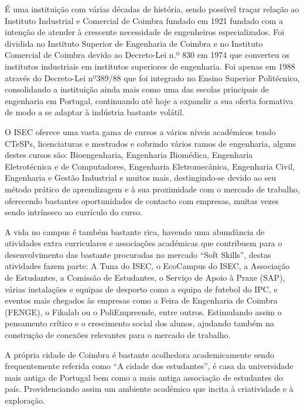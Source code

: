         É uma instituição com várias décadas de história, sendo possível traçar relação ao Instituto Industrial e Comercial de Coimbra fundado em 1921\cite{iscac} fundado com a intenção de atender à crescente necessidade de engenheiros especializados. Foi dividida no Instituto Superior de Engenharia de Coimbra e no Instituto Comercial de Coimbra devido ao Decreto-Lei n.º 830\cite{iscac} em 1974 que converteu os institutos industriais em institutos superiores de engenharia. Foi apenas em 1988\cite{wiki-isec} através do Decreto-Lei nº389/88\cite{decreto389/88} que foi integrado no Ensino Superior Politécnico, consolidando a instituição ainda mais como uma das escolas principais de engenharia em Portugal, continuando até hoje a expandir a sua oferta formativa de modo a se adaptar à indústria bastante volátil.
    
        O ISEC oferece uma vasta gama de cursos a vários níveis académicos tendo CTeSPs, licenciaturas e mestrados e cobrindo vários ramos de engenharia, alguns destes cursos são: Bioengenharia, Engenharia Biomédica, Engenharia Eletrotécnica e de Computadores, Engenharia Eletromecânica, Engenharia Civil, Engenharia e Gestão Industrial e muitos mais, destingindo-se devido ao seu método prático de aprendizagem e à sua proximidade com o mercado de trabalho, oferecendo bastantes oportunidades de contacto com empresas, muitas vezes sendo intrínseco ao currículo do curso.
    
        A vida no campus é também bastante rica, havendo uma abundância de atividades extra curriculares e associações académicas que contribuem para o desenvolvimento das bastante procuradas no mercado ``Soft Skills'', destas atividades fazem parte: A Tuna do ISEC, o EcoCampus do ISEC, a Associação de Estudantes, a Comissão de Estudantes, o Serviço de Apoio à Praxe (SAP), várias instalações e equipas de desporto como a equipa de futebol do IPC, e eventos mais chegados às empresas como a Feira de Engenharia de Coimbra (FENGE), o Fikalab ou o PoliEmpreende, entre outros. Estimulando assim o pensamento crítico e o crescimento social dos alunos, ajudando também na construção de conexões relevantes para o mercado de trabalho.
    
        A própria cidade de Coimbra é bastante acolhedora academicamente sendo frequentemente referida como ``A cidade dos estudantes'', é casa da universidade mais antiga de Portugal\cite{universidade-coimbra} bem como a mais antiga associação de estudantes do país\cite{wiki-associacao}. Providenciando assim um ambiente académico que incita à criatividade e à exploração.
    
